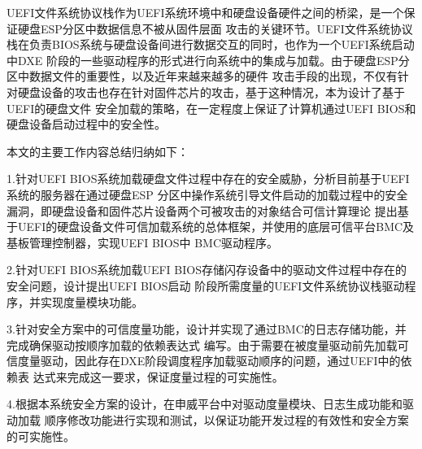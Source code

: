 \begin{APP}
UEFI文件系统协议栈作为UEFI系统环境中和硬盘设备硬件之间的桥梁，是一个保证硬盘ESP分区中数据信息不被从固件层面
攻击的关键环节。UEFI文件系统协议栈在负责BIOS系统与硬盘设备间进行数据交互的同时，也作为一个UEFI系统启动中DXE
阶段的一些驱动程序的形式进行向系统中的集成与加载。由于硬盘ESP分区中数据文件的重要性，以及近年来越来越多的硬件
攻击手段的出现，不仅有针对硬盘设备的攻击也存在针对固件芯片的攻击，基于这种情况，本为设计了基于UEFI的硬盘文件
安全加载的策略，在一定程度上保证了计算机通过UEFI BIOS和硬盘设备启动过程中的安全性。
\par 本文的主要工作内容总结归纳如下：
\par 1.针对UEFI BIOS系统加载硬盘文件过程中存在的安全威胁，分析目前基于UEFI系统的服务器在通过硬盘ESP
分区中操作系统引导文件启动的加载过程中的安全漏洞，即硬盘设备和固件芯片设备两个可被攻击的对象结合可信计算理论
提出基于UEFI的硬盘设备文件可信加载系统的总体框架，并使用的底层可信平台BMC及基板管理控制器，实现UEFI BIOS中
BMC驱动程序。
\par 2.针对UEFI BIOS系统加载UEFI BIOS存储闪存设备中的驱动文件过程中存在的安全问题，设计提出UEFI BIOS启动
阶段所需度量的UEFI文件系统协议栈驱动程序，并实现度量模块功能。
\par 3.针对安全方案中的可信度量功能，设计并实现了通过BMC的日志存储功能，并完成确保驱动按顺序加载的依赖表达式
编写。由于需要在被度量驱动前先加载可信度量驱动，因此存在DXE阶段调度程序加载驱动顺序的问题，通过UEFI中的依赖表
达式来完成这一要求，保证度量过程的可实施性。
\par 4.根据本系统安全方案的设计，在申威平台中对驱动度量模块、日志生成功能和驱动加载
顺序修改功能进行实现和测试，以保证功能开发过程的有效性和安全方案的可实施性。

\end{APP}
